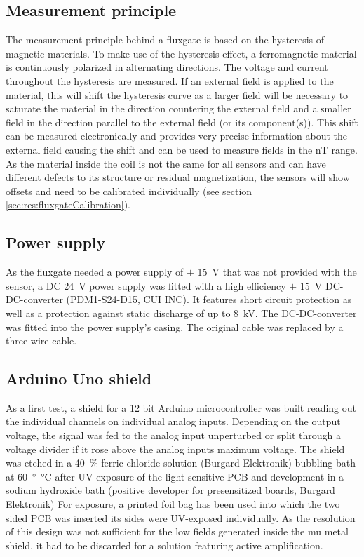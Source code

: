         \subsection{Measurement principle}
        \label{sec:matMeth:fluxgateMeasurementPrinciple}
        The measurement principle behind a fluxgate is based on the hysteresis of magnetic materials. To make use of the hysteresis effect, a ferromagnetic material is continuously polarized in alternating directions. The voltage and current throughout the hysteresis are measured. If an external field is applied to the material, this will shift the hysteresis curve as a larger field will be necessary to saturate the material in the direction countering the external field and a smaller field in the direction parallel to the external field (or its component(s)). This shift can be measured electronically and provides very precise information about the external field causing the shift and can be used to measure fields in the \si{\nano\tesla} range. As the material inside the coil is not the same for all sensors and can have different defects to its structure or residual magnetization, the sensors will show offsets and need to be calibrated individually (see section \ref{sec:res:fluxgateCalibration}).
        \subsection{Power supply}
        As the fluxgate needed a power supply of $\pm$ \SI{15}{\volt} that was not provided with the sensor, a DC \SI{24}{\volt} power supply was fitted with a high efficiency $\pm$ \SI{15}{\volt} DC-DC-converter (PDM1-S24-D15, CUI INC). It features short circuit protection as well as a protection against static discharge of up to \SI{8}{\kilo\volt}. The DC-DC-converter was fitted into the power supply's casing. The original cable was replaced by a three-wire cable.
        \subsection{Arduino Uno shield}
        As a first test, a shield for a 12 bit Arduino microcontroller was built reading out the individual channels on individual analog inputs.  Depending on the output voltage, the signal was fed to the analog input unperturbed or split through a voltage divider if it rose above the analog inputs maximum voltage.  The shield was etched in a \SI{40}{\percent} ferric chloride solution (Burgard Elektronik) bubbling bath at \SI{60}{\degree\celsius} after UV-exposure of the light sensitive PCB and development in a sodium hydroxide bath (positive developer for presensitized boards, Burgard Elektronik)  For exposure, a printed foil bag has been used into which the two sided PCB was inserted  its sides were UV-exposed individually.  As the resolution of this design was not sufficient for the low fields generated inside the mu metal shield, it had to be discarded for a solution featuring active amplification.
